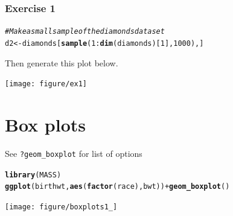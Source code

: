 \documentclass{beamer}\usepackage[]{graphicx}\usepackage[]{color}
\makeatletter
\newcommand{\hlcom}[1]{\textcolor[rgb]{0.678,0.584,0.686}{\textit{#1}}}%
\newcommand{\hlkwd}[1]{\textcolor[rgb]{0.737,0.353,0.396}{\textbf{#1}}}%
\newenvironment{kframe}{%
 \def\at@end@of@kframe{}%
 \ifinner\ifhmode%
  \def\at@end@of@kframe{\end{minipage}}%
  \begin{minipage}{\columnwidth}%
 \fi\fi%
 \def\FrameCommand##1{\hskip\@totalleftmargin \hskip-\fboxsep
 \colorbox{shadecolor}{##1}\hskip-\fboxsep
     \hskip-\linewidth \hskip-\@totalleftmargin \hskip\columnwidth}%
 \MakeFramed {\advance\hsize-\width
   \@totalleftmargin\z@ \linewidth\hsize
   \@setminipage}}%
 {\par\unskip\endMakeFramed%
 \at@end@of@kframe}
\newenvironment{knitrout}{}{} %
\makeatother
\begin{document}
\begin{frame}[fragile]
\frametitle{Exercise 1}
\begin{knitrout}\footnotesize
{}\color{fgcolor}\begin{kframe}
\begin{alltt}
\hlcom{# Make a small sample of the diamonds dataset}
d2 <- diamonds[\hlkwd{sample}(1:\hlkwd{dim}(diamonds)[1], 1000), ]
\end{alltt}
\end{kframe}
\end{knitrout}

Then generate this plot below.

\begin{knitrout}\footnotesize
{}\color{fgcolor}

{\centering \texttt{[image: figure/ex1]} 

}



\end{knitrout}

\end{frame}


\section*{Box plots}
\frame{\sectionpage}


\begin{frame}[fragile]
See \texttt{?geom\_boxplot} for list of options
\begin{knitrout}\footnotesize
{}\color{fgcolor}\begin{kframe}
\begin{alltt}
\hlkwd{library}(MASS)
\hlkwd{ggplot}(birthwt, \hlkwd{aes}(\hlkwd{factor}(race), bwt)) + \hlkwd{geom_boxplot}()
\end{alltt}
\end{kframe}

{\centering \texttt{[image: figure/boxplots1\_]} 

}



\end{knitrout}

\end{frame}
\end{document}
